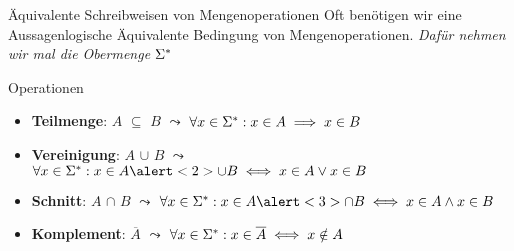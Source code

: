 \begin{frame}[fragile]{Äquivalente Schreibweisen von Mengenoperationen}
	Oft benötigen wir eine Aussagenlogische Äquivalente Bedingung von Mengenoperationen. \emph{Dafür nehmen wir mal die Obermenge $\Sigma^{*}$}
	\begin{block}{Operationen}
		\begin{itemize}
			\item<1-> \textbf{Teilmenge}: $A$ \alert<1>{$\subseteq$} $B$ $\leadsto$ $\forall x \in \Sigma^{*} : x \in A \implies x \in B$\\
			\item<2-> \textbf{Vereinigung}: $A$ \alert<2>{$\cup$} $B$ $\leadsto$ $\forall x \in \SigmaStern : x \in A \alert<2>{\cup} B \iff x \in A \vee x \in B$\\
			\item<3-> \textbf{Schnitt}: $A$ \alert<3>{$\cap$} $B$ $\leadsto$ $\forall x \in \SigmaStern : x \in A \alert<3>{\cap} B \iff x \in A \wedge x \in B$\\
			\item<4-> \textbf{Komplement}: \alert<4>{$\overline{A}$} $\leadsto$ $\forall x \in \Sigma^{*} : x \in \overline{A} \iff x \notin A$
		\end{itemize}
	\end{block}
	
\end{frame}
